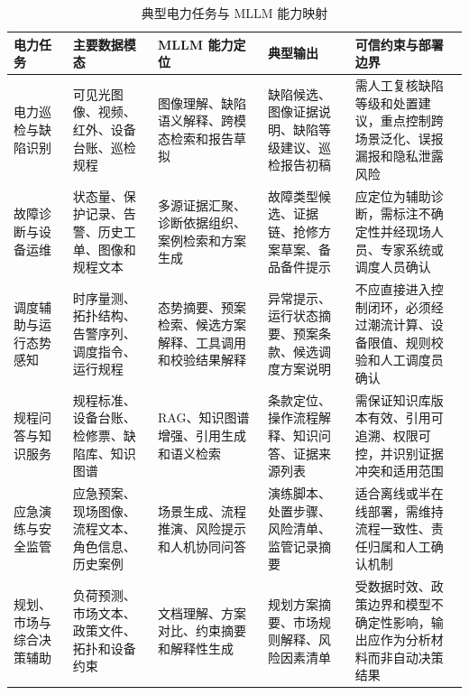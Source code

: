\documentclass[10.5pt,compsoc]{CjC}
\theoremstyle{mystyle}
\begin{document}
\begin{table}[htbp]
\centering
\caption{典型电力任务与 MLLM 能力映射}
\label{tab:task_mapping}
\songti
\setlength{\tabcolsep}{3pt}
\renewcommand{\arraystretch}{1.16}
\begin{tabularx}{\textwidth}{p{} p{} p{} p{} X}
\toprule
电力任务 & 主要数据模态 & MLLM 能力定位 & 典型输出 & 可信约束与部署边界 \\
\midrule
电力巡检与缺陷识别 & 可见光图像、视频、红外、设备台账、巡检规程 & 图像理解、缺陷语义解释、跨模态检索和报告草拟 & 缺陷候选、图像证据说明、缺陷等级建议、巡检报告初稿 & 需人工复核缺陷等级和处置建议，重点控制跨场景泛化、误报漏报和隐私泄露风险 \\
故障诊断与设备运维 & 状态量、保护记录、告警、历史工单、图像和规程文本 & 多源证据汇聚、诊断依据组织、案例检索和方案生成 & 故障类型候选、证据链、抢修方案草案、备品备件提示 & 应定位为辅助诊断，需标注不确定性并经现场人员、专家系统或调度人员确认 \\
调度辅助与运行态势感知 & 时序量测、拓扑结构、告警序列、调度指令、运行规程 & 态势摘要、预案检索、候选方案解释、工具调用和校验结果解释 & 异常提示、运行状态摘要、预案条款、候选调度方案说明 & 不应直接进入控制闭环，必须经过潮流计算、设备限值、规则校验和人工调度员确认 \\
规程问答与知识服务 & 规程标准、设备台账、检修票、缺陷库、知识图谱 & RAG、知识图谱增强、引用生成和语义检索 & 条款定位、操作流程解释、知识问答、证据来源列表 & 需保证知识库版本有效、引用可追溯、权限可控，并识别证据冲突和适用范围 \\
应急演练与安全监管 & 应急预案、现场图像、流程文本、角色信息、历史案例 & 场景生成、流程推演、风险提示和人机协同问答 & 演练脚本、处置步骤、风险清单、监管记录摘要 & 适合离线或半在线部署，需维持流程一致性、责任归属和人工确认机制 \\
规划、市场与综合决策辅助 & 负荷预测、市场文本、政策文件、拓扑和设备约束 & 文档理解、方案对比、约束摘要和解释性生成 & 规划方案摘要、市场规则解释、风险因素清单 & 受数据时效、政策边界和模型不确定性影响，输出应作为分析材料而非自动决策结果 \\
\bottomrule
\end{tabularx}
\end{table}
\end{document}
